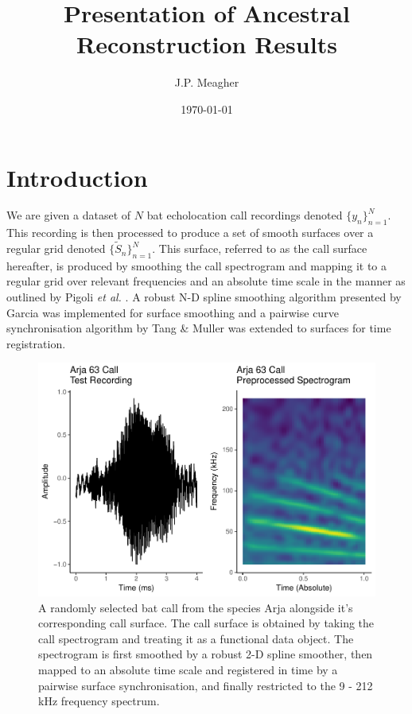 \documentclass[]{article}
\title{Presentation of Ancestral Reconstruction Results}
\author{J.P. Meagher}
\date{\today}
\begin{document}
\maketitle

\section{Introduction}\label{introduction}

We are given a dataset of \(N\) bat echolocation call recordings denoted \(\{y_n\}_{n = 1}^N\). This recording is then processed to produce a set of smooth surfaces over a regular grid denoted \(\{\tilde{S}_n\}_{n=1}^{N}\). This surface, referred to as the call surface hereafter, is produced by smoothing the call spectrogram and mapping it to a regular grid over relevant frequencies and an absolute time scale in the manner as outlined by Pigoli \textit{et al.} \cite{pigoli2015analysis}. A robust N-D spline smoothing algorithm presented by Garcia \cite{garcia2010robust} was implemented for surface smoothing and a pairwise curve synchronisation algorithm by Tang \& Muller \cite{tang2008pairwise} was extended to surfaces for time registration.

\begin{figure}[htbp]
\centering
\includegraphics{for_mark_files/figure-latex/recording figure-1.pdf}
\caption{A randomly selected bat call from the species Arja alongside it's corresponding call surface. The call surface is obtained by taking the call spectrogram and treating it as a functional data object. The spectrogram is first smoothed by a robust 2-D spline smoother, then mapped to an absolute time scale and registered in time by a pairwise surface synchronisation, and finally restricted to the 9 - 212 kHz frequency spectrum.}
\label{fig:data}
\end{figure}
\end{document}
